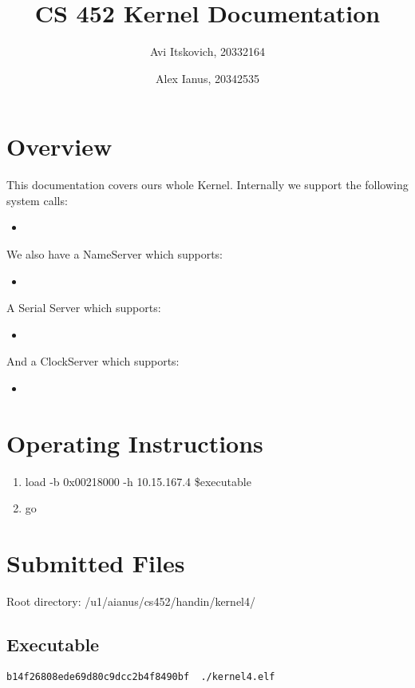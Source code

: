 \documentclass{article}
\title{CS 452 Kernel Documentation}
\author{
  Avi Itskovich, 20332164
  \and
  Alex Ianus, 20342535
}
\begin{document}
\maketitle

\section{Overview}

This documentation covers ours whole Kernel. Internally we support the following system calls:

\begin{itemize}
  \item %
\end{itemize}

We also have a NameServer which supports:

\begin{itemize}
  \item %
\end{itemize}

A Serial Server which supports:

\begin{itemize}
  \item %
\end{itemize}

And a ClockServer which supports:

\begin{itemize}
  \item %
\end{itemize}

\section{Operating Instructions}
\begin{enumerate}
  \item load -b 0x00218000 -h 10.15.167.4 \$executable
  \item go
\end{enumerate}

\section{Submitted Files}
Root directory: /u1/aianus/cs452/handin/kernel4/

\subsection{Executable}
\begin{verbatim}
b14f26808ede69d80c9dcc2b4f8490bf  ./kernel4.elf
\end{verbatim}
\end{document}
